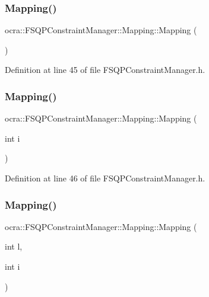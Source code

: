 \subsubsection{\texorpdfstring{Mapping()}{Mapping()}\hspace{0.1cm}{\footnotesize\ttfamily [1/3]}}
{\footnotesize\ttfamily ocra\+::\+F\+S\+Q\+P\+Constraint\+Manager\+::\+Mapping\+::\+Mapping (\begin{DoxyParamCaption}{ }\end{DoxyParamCaption})\hspace{0.3cm}{\ttfamily [inline]}}



Definition at line 45 of file F\+S\+Q\+P\+Constraint\+Manager.\+h.

\hypertarget{structocra_1_1FSQPConstraintManager_1_1Mapping_a167e78a7d81b7024c6d63743c7fd4b2a}{}\label{structocra_1_1FSQPConstraintManager_1_1Mapping_a167e78a7d81b7024c6d63743c7fd4b2a} 
\subsubsection{\texorpdfstring{Mapping()}{Mapping()}\hspace{0.1cm}{\footnotesize\ttfamily [2/3]}}
{\footnotesize\ttfamily ocra\+::\+F\+S\+Q\+P\+Constraint\+Manager\+::\+Mapping\+::\+Mapping (\begin{DoxyParamCaption}\item[{int}]{i }\end{DoxyParamCaption})\hspace{0.3cm}{\ttfamily [inline]}}



Definition at line 46 of file F\+S\+Q\+P\+Constraint\+Manager.\+h.

\hypertarget{structocra_1_1FSQPConstraintManager_1_1Mapping_a82a59fc4b00d863a2527e5265a965441}{}\label{structocra_1_1FSQPConstraintManager_1_1Mapping_a82a59fc4b00d863a2527e5265a965441} 
\subsubsection{\texorpdfstring{Mapping()}{Mapping()}\hspace{0.1cm}{\footnotesize\ttfamily [3/3]}}
{\footnotesize\ttfamily ocra\+::\+F\+S\+Q\+P\+Constraint\+Manager\+::\+Mapping\+::\+Mapping (\begin{DoxyParamCaption}\item[{int}]{l,  }\item[{int}]{i }\end{DoxyParamCaption})\hspace{0.3cm}{\ttfamily [inline]}}



